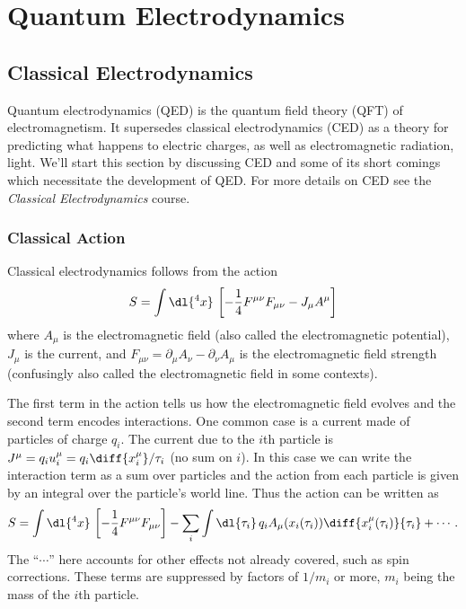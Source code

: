 \documentclass[fleqn]{NotesClass}
\newcommand*{\course}[1]{\textit{#1}}
\begin{document}
    \part{Quantum Electrodynamics}
    \chapter{Classical Electrodynamics}
    Quantum electrodynamics (QED) is the quantum field theory (QFT) of electromagnetism.
    It supersedes classical electrodynamics (CED) as a theory for predicting what happens to electric charges, as well as electromagnetic radiation, light.
    We'll start this section by discussing CED and some of its short comings which necessitate the development of QED.
    For more details on CED see the \course{Classical Electrodynamics} course.
    
    \section{Classical Action}
    Classical electrodynamics follows from the action
    \begin{equation}
        S = \int \dl{^4x} \, \left[ -\frac{1}{4} F^{\mu\nu}F_{\mu\nu} - J_\mu A^\mu \right]
    \end{equation}
    where \(A_\mu\) is the electromagnetic field (also called the electromagnetic potential), \(J_\mu\) is the current, and \(F_{\mu\nu} = \partial_\mu A_\nu - \partial_\nu A_\mu\) is the electromagnetic field strength (confusingly also called the electromagnetic field in some contexts).
    
    The first term in the action tells us how the electromagnetic field evolves and the second term encodes interactions.
    One common case is a current made of particles of charge \(q_i\).
    The current due to the \(i\)th particle is \(J^\mu = q_i u_i^\mu = q_i \diff{x_i^\mu}/{\tau_i}\) (no sum on \(i\)).
    In this case we can write the interaction term as a sum over particles and the action from each particle is given by an integral over the particle's world line.
    Thus the action can be written as
    \begin{equation}
        S = \int \dl{^4x} \, \left[ -\frac{1}{4}F^{\mu\nu}F_{\mu\nu} \right] - \sum_{i} \int \dl{\tau_i} \, q_i A_\mu(x_i(\tau_i)) \diff{x_i^\mu(\tau_i)}{\tau_i} + \dotsb.
    \end{equation}
    The \enquote{\(\dotsb\)} here accounts for other effects not already covered, such as spin corrections.
    These terms are suppressed by factors of \(1/m_i\) or more, \(m_i\) being the mass of the \(i\)th particle.
    
\end{document}
